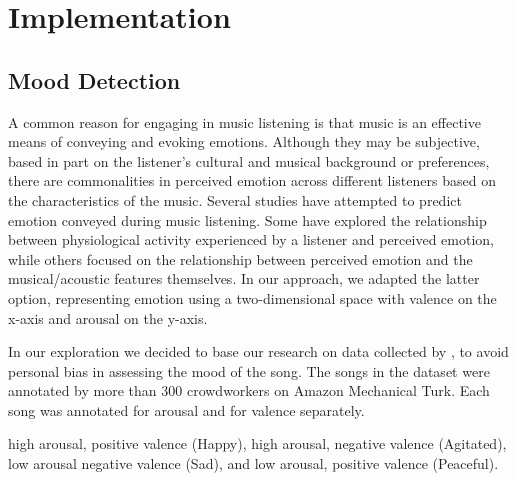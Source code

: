 
\chapter{Implementation} %

\label{Chapter3} %



\section{Mood Detection}

A common reason for engaging in music listening is that music is an effective means of conveying and evoking emotions. Although they may be subjective, based in part on the listener’s cultural and musical background or preferences, there are commonalities in perceived emotion across different listeners based on the characteristics of the music. Several studies have attempted to predict emotion conveyed during music listening. Some have explored the relationship between physiological activity experienced by a listener and perceived emotion, while others focused on the relationship between perceived emotion and the musical/acoustic features themselves. In our approach, we adapted the latter option, representing emotion using a two-dimensional space with valence on the x-axis and arousal on the y-axis.

In our exploration we decided to base our research on data collected by \cite{1000songs}, to avoid personal bias in assessing the mood of the song. The songs in the dataset were annotated by more than 300 crowdworkers on Amazon Mechanical Turk. Each song was annotated for arousal and for valence separately.




high arousal, positive valence (Happy), high arousal, negative valence (Agitated), low arousal negative valence (Sad), and low arousal, positive valence (Peaceful). 



